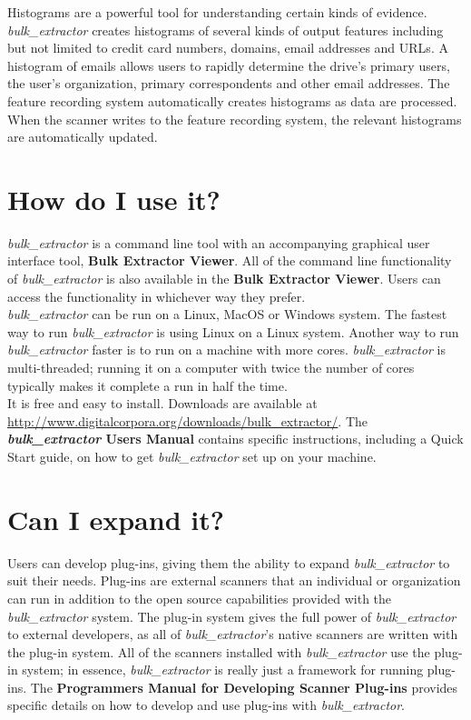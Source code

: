\documentclass[DIV=calc, paper=a4, fontsize=11pt]{article}	 %
\newcommand \bulk {\textit{bulk\_extractor}\xspace}
\begin{document}
\noindent
Histograms are a powerful tool for understanding certain kinds of evidence. \bulk creates histograms of several kinds of output features including but not limited to credit card numbers, domains, email addresses and URLs. A histogram of emails allows users to rapidly determine the drive's primary users,  the user's organization, primary correspondents and other email addresses. The feature recording system automatically creates histograms as data are processed. When the scanner writes to the feature recording system, the relevant histograms are automatically updated. 

\section*{How do I use it?}
\bulk is a command line tool with an accompanying graphical user interface tool, \textbf{Bulk Extractor Viewer}. All of the command line functionality of \bulk is also available in the \textbf{Bulk Extractor Viewer}. Users can access the functionality in whichever way they prefer. \\

\noindent
\bulk can be run on a Linux, MacOS or Windows system. The fastest way to run \bulk is using Linux on a Linux system. Another way to run \bulk faster is to run on a machine with more cores. \bulk is multi-threaded; running it on a computer with twice the number of cores typically makes it complete a run in half the time.  \\

\noindent
It is free and easy to install. Downloads are available at \url{http://www.digitalcorpora.org/downloads/bulk_extractor/}. The \textbf{\bulk Users Manual} \cite{usersManual} contains specific instructions, including a Quick Start guide, on how to get \bulk set up on your machine.

\section*{Can I expand it?}
Users can develop plug-ins, giving them the ability to expand \bulk to suit their needs. Plug-ins are external scanners that an individual or organization can run in addition to the open source capabilities provided with the \bulk system. The plug-in system gives the full power of \bulk to external developers, as all of \bulk's native scanners are written with the plug-in system. All of the scanners installed with \bulk use the plug-in system; in essence, \bulk is really just a framework for running plug-ins. The \textbf{Programmers Manual for Developing Scanner Plug-ins} \cite{programmersManual} provides specific details on how to develop and use plug-ins with \bulk.
\end{document}
